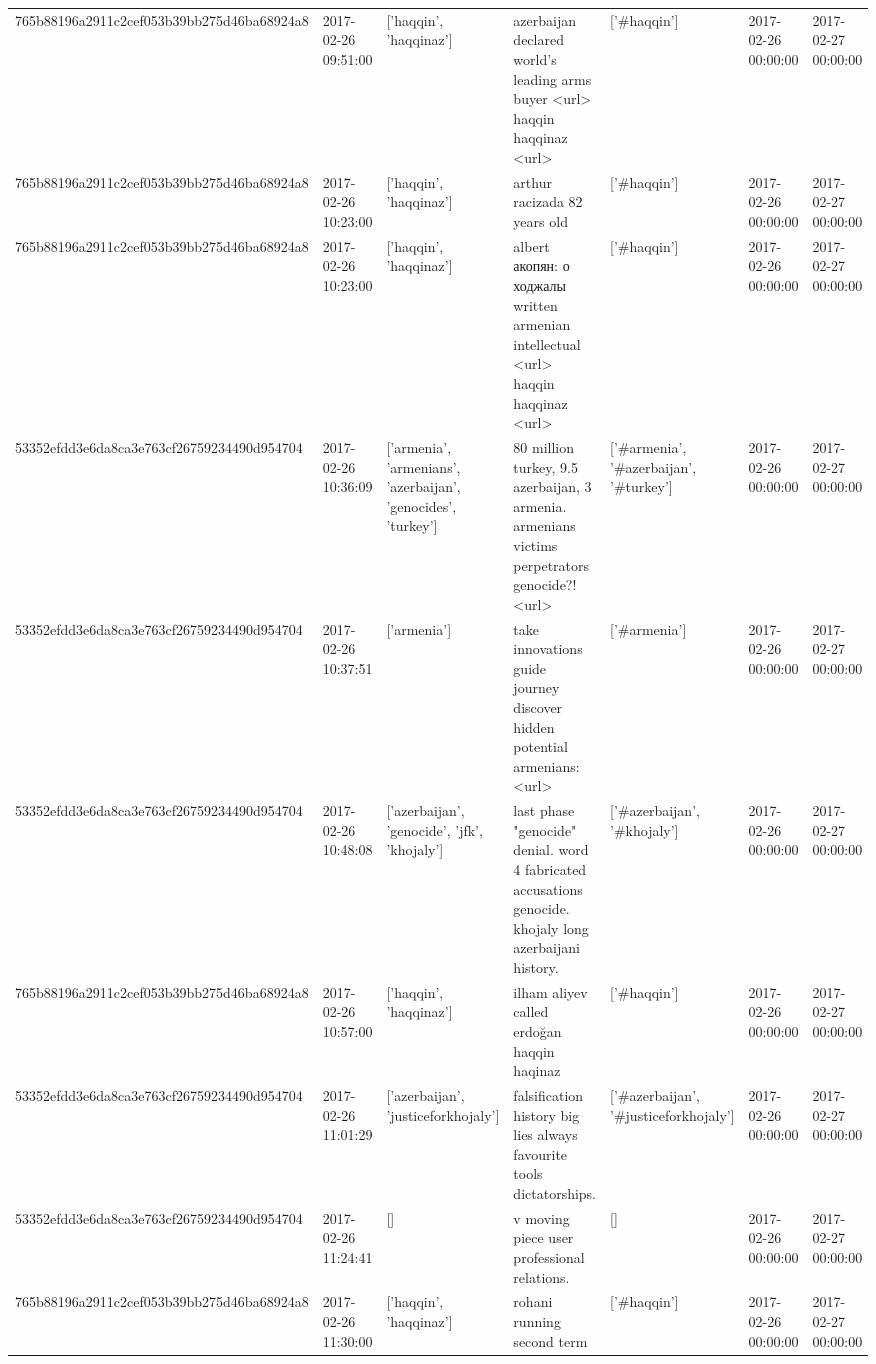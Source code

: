 \begin{tabular}{lllllll}
765b88196a2911c2cef053b39bb275d46ba68924a8 & 2017-02-26 09:51:00 & ['haqqin', 'haqqinaz'] & azerbaijan declared world's leading arms buyer <url> haqqin haqqinaz <url> & ['#haqqin'] & 2017-02-26 00:00:00 & 2017-02-27 00:00:00 \\
765b88196a2911c2cef053b39bb275d46ba68924a8 & 2017-02-26 10:23:00 & ['haqqin', 'haqqinaz'] & arthur racizada 82 years old & ['#haqqin'] & 2017-02-26 00:00:00 & 2017-02-27 00:00:00 \\
765b88196a2911c2cef053b39bb275d46ba68924a8 & 2017-02-26 10:23:00 & ['haqqin', 'haqqinaz'] & albert акопян: о ходжалы written armenian intellectual <url> haqqin haqqinaz <url> & ['#haqqin'] & 2017-02-26 00:00:00 & 2017-02-27 00:00:00 \\
53352efdd3e6da8ca3e763cf26759234490d954704 & 2017-02-26 10:36:09 & ['armenia', 'armenians', 'azerbaijan', 'genocides', 'turkey'] & 80 million turkey, 9.5 azerbaijan, 3 armenia. armenians victims perpetrators genocide?! <url> & ['#armenia', '#azerbaijan', '#turkey'] & 2017-02-26 00:00:00 & 2017-02-27 00:00:00 \\
53352efdd3e6da8ca3e763cf26759234490d954704 & 2017-02-26 10:37:51 & ['armenia'] & take innovations guide journey discover hidden potential armenians: <url> & ['#armenia'] & 2017-02-26 00:00:00 & 2017-02-27 00:00:00 \\
53352efdd3e6da8ca3e763cf26759234490d954704 & 2017-02-26 10:48:08 & ['azerbaijan', 'genocide', 'jfk', 'khojaly'] & last phase "genocide" denial. word 4 fabricated accusations genocide. khojaly long azerbaijani history. & ['#azerbaijan', '#khojaly'] & 2017-02-26 00:00:00 & 2017-02-27 00:00:00 \\
765b88196a2911c2cef053b39bb275d46ba68924a8 & 2017-02-26 10:57:00 & ['haqqin', 'haqqinaz'] & ilham aliyev called erdoğan haqqin haqinaz & ['#haqqin'] & 2017-02-26 00:00:00 & 2017-02-27 00:00:00 \\
53352efdd3e6da8ca3e763cf26759234490d954704 & 2017-02-26 11:01:29 & ['azerbaijan', 'justiceforkhojaly'] & falsification history big lies always favourite tools dictatorships. & ['#azerbaijan', '#justiceforkhojaly'] & 2017-02-26 00:00:00 & 2017-02-27 00:00:00 \\
53352efdd3e6da8ca3e763cf26759234490d954704 & 2017-02-26 11:24:41 & [] & v moving piece user professional relations. & [] & 2017-02-26 00:00:00 & 2017-02-27 00:00:00 \\
765b88196a2911c2cef053b39bb275d46ba68924a8 & 2017-02-26 11:30:00 & ['haqqin', 'haqqinaz'] & rohani running second term & ['#haqqin'] & 2017-02-26 00:00:00 & 2017-02-27 00:00:00 \\

\end{tabular}

